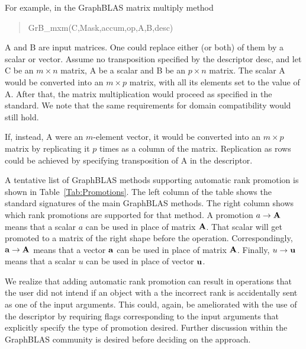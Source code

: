 For example, in the GraphBLAS matrix multiply method 
\begin{quote} 
{\sf GrB\_mxm(C,Mask,accum,op,A,B,desc)}
\end{quote}
{\sf A} and {\sf B} are input matrices. One could replace either (or both)
of them by a scalar or vector.  Assume no transposition specified by the
descriptor {\sf desc}, and let {\sf C} be an $m \times n$ matrix, {\sf A}
be a scalar and {\sf B} be an $p \times n$ matrix. The scalar {\sf A}
would be converted into an $m \times p$ matrix, with all its elements
set to the value of {\sf A}.  After that, the matrix multiplication would
proceed as specified in the standard.  We note that the same requirements
for domain compatibility would still hold.

If, instead, {\sf A} were an $m$-element vector, it would be converted
into an $m \times p$ matrix by replicating it $p$ times as a column
of the matrix.  Replication as rows could be achieved by specifying
transposition of {\sf A} in the descriptor.

A tentative list of GraphBLAS methods supporting automatic rank promotion
is shown in Table~\ref{Tab:Promotions}.  The left column of the table
shows the standard signatures of the main GraphBLAS methods. The right
column shows which rank promotions are supported for that method. A
promotion $a \rightarrow {\bf A}$ means that a scalar $a$ can be
used in place of matrix ${\bf A}$. That scalar will get promoted to a matrix
of the right shape before the operation.  Correspondingly, ${\bf a}
\rightarrow {\bf A}$ means that a vector ${\bf a}$ can be used in
place of matrix ${\bf A}$. Finally, $u \rightarrow {\bf u}$ means that a
scalar $u$ can be used in place of vector ${\bf u}$.

We realize that adding automatic rank promotion can result in operations that the
user did not intend if an object with a the incorrect rank is accidentally sent
as one of the input arguments.  This could, again, be ameliorated with the use 
of the descriptor by requiring flags corresponding to the input arguments that
explicitly specify the type of promotion desired.  Further discussion within the GraphBLAS
community is desired before deciding on the approach.

